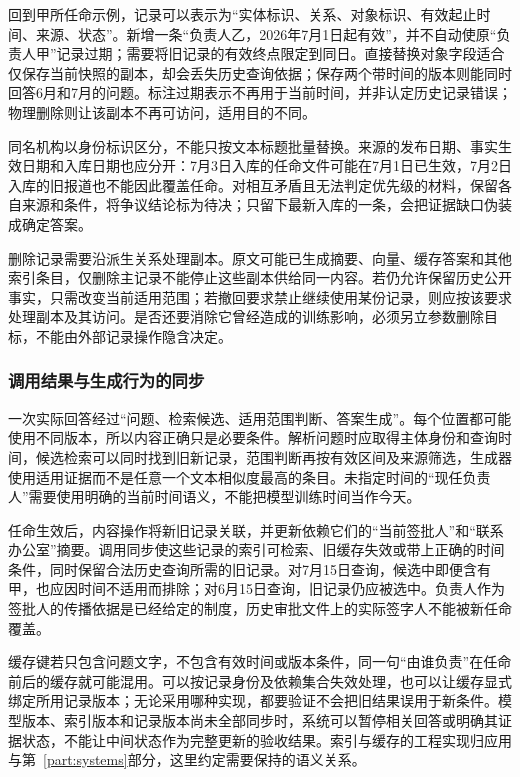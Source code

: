 回到甲所任命示例，记录可以表示为“实体标识、关系、对象标识、有效起止时间、来源、状态”。新增一条“负责人乙，2026年7月1日起有效”，并不自动使原“负责人甲”记录过期；需要将旧记录的有效终点限定到同日。直接替换对象字段适合仅保存当前快照的副本，却会丢失历史查询依据；保存两个带时间的版本则能同时回答6月和7月的问题。标注过期表示不再用于当前时间，并非认定历史记录错误；物理删除则让该副本不再可访问，适用目的不同。

同名机构以身份标识区分，不能只按文本标题批量替换。来源的发布日期、事实生效日期和入库日期也应分开：7月3日入库的任命文件可能在7月1日已生效，7月2日入库的旧报道也不能因此覆盖任命。对相互矛盾且无法判定优先级的材料，保留各自来源和条件，将争议结论标为待决；只留下最新入库的一条，会把证据缺口伪装成确定答案。

删除记录需要沿派生关系处理副本。原文可能已生成摘要、向量、缓存答案和其他索引条目，仅删除主记录不能停止这些副本供给同一内容。若仍允许保留历史公开事实，只需改变当前适用范围；若撤回要求禁止继续使用某份记录，则应按该要求处理副本及其访问。是否还要消除它曾经造成的训练影响，必须另立参数删除目标，不能由外部记录操作隐含决定。

\subsubsection{调用结果与生成行为的同步}
\label{sec:ket-update-sync}

一次实际回答经过“问题、检索候选、适用范围判断、答案生成”。每个位置都可能使用不同版本，所以内容正确只是必要条件。解析问题时应取得主体身份和查询时间，候选检索可以同时找到旧新记录，范围判断再按有效区间及来源筛选，生成器使用适用证据而不是任意一个文本相似度最高的条目。未指定时间的“现任负责人”需要使用明确的当前时间语义，不能把模型训练时间当作今天。

任命生效后，内容操作将新旧记录关联，并更新依赖它们的“当前签批人”和“联系办公室”摘要。调用同步使这些记录的索引可检索、旧缓存失效或带上正确的时间条件，同时保留合法历史查询所需的旧记录。对7月15日查询，候选中即便含有甲，也应因时间不适用而排除；对6月15日查询，旧记录仍应被选中。负责人作为签批人的传播依据是已经给定的制度，历史审批文件上的实际签字人不能被新任命覆盖。

缓存键若只包含问题文字，不包含有效时间或版本条件，同一句“由谁负责”在任命前后的缓存就可能混用。可以按记录身份及依赖集合失效处理，也可以让缓存显式绑定所用记录版本；无论采用哪种实现，都要验证不会把旧结果误用于新条件。模型版本、索引版本和记录版本尚未全部同步时，系统可以暂停相关回答或明确其证据状态，不能让中间状态作为完整更新的验收结果。索引与缓存的工程实现归应用与第~\ref{part:systems}部分，这里约定需要保持的语义关系。

